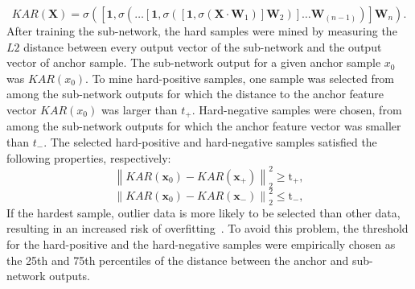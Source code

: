\begin{equation}
    KAR\left(\mathbf{X}\right)=\sigma\left(\left[\mathbf{1},\sigma\left(\dots\left[\mathbf{1},\sigma\left(\left[\mathbf{1},\sigma\left(\mathbf{X}\cdot\mathbf{W}_{1}\right)\right]\mathbf{W}_{2}\right)\right]\dots\mathbf{W}_{(n-1)}\right)\right]\mathbf{W}_{n}\right).
\end{equation}
After training the sub-network, the hard samples were mined by measuring the $L2$ distance between every output vector of the sub-network and the output vector of anchor sample.
The sub-network output for a given anchor sample $x_0$ was $KAR(x_0)$. To mine hard-positive samples, one sample was selected from among the sub-network outputs for which the distance to the anchor feature vector $KAR(x_0)$ was larger than $t_+$. Hard-negative samples were chosen, from among the sub-network outputs for which the anchor feature vector was smaller than $t_-$.
The selected hard-positive and hard-negative samples satisfied the following properties, respectively:
\begin{equation}
    {\left\| {{KAR\left(\mathbf{x}_{0}\right)} - {KAR\left(\mathbf{x}_{+}\right)}} \right\|_2^2} \geq \mathrm{t}_{+}, 
    \label{thres_pos}
\end{equation}
\begin{equation}
    {\left\| {{KAR\left(\mathbf{x}_{0}\right)} - {KAR\left(\mathbf{x}_{-}\right)}} \right\|_2^2} \leq \mathrm{t}_{-},\label{thres_neg}
\end{equation}
If the hardest sample, outlier data is more likely to be selected than other data, resulting in an increased risk of overfitting~\cite{schroff2015facenet}.
To avoid this problem, the threshold for the hard-positive and the hard-negative samples were empirically chosen as the 25th and 75th percentiles of the distance between the anchor and sub-network outputs.

